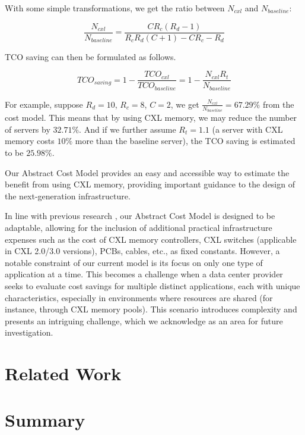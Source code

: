 

With some simple transformations, we get the ratio between $N_{cxl}$ and $N_{baseline}$: 

$$ \frac{N_{cxl}}{N_{baseline}} = \frac{CR_c(R_d - 1)}{R_cR_d(C+1) - C R_c - R_d} $$

TCO saving can then be formulated as follows.

$$
TCO_{saving}=1-\frac{TCO_{cxl}}{TCO_{baseline}}=1-\frac{N_{cxl} R_t}{N_{baseline}}
$$


For example, suppose $ R_d = 10 $, $R_c = 8 $, $ C = 2 $, we get $\frac{N_{cxl}}{N_{baseline}} = 67.29\%$ from the cost model.
This means that by using CXL memory, we may reduce the number of servers by $32.71\%$.
And if we further assume $R_t=1.1$ (a server with CXL memory costs $10\%$ more than the baseline server), the TCO saving is estimated to be $25.98\%$.

Our Abstract Cost Model provides an easy and accessible way to estimate the benefit from using CXL memory,
providing important guidance to the design of the next-generation infrastructure.

In line with previous research \cite{CXLPoolCost}, our Abstract Cost Model is designed to be adaptable, allowing for the inclusion of additional practical infrastructure expenses such as the cost of CXL memory controllers, CXL switches (applicable in CXL 2.0/3.0 versions), PCBs, cables, etc., as fixed constants. However, a notable constraint of our current model is its focus on only one type of application at a time. This becomes a challenge when a data center provider seeks to evaluate cost savings for multiple distinct applications, each with unique characteristics, especially in environments where resources are shared (for instance, through CXL memory pools). This scenario introduces complexity and presents an intriguing challenge, which we acknowledge as an area for future investigation.

\section {Related Work}
\section{Summary}
